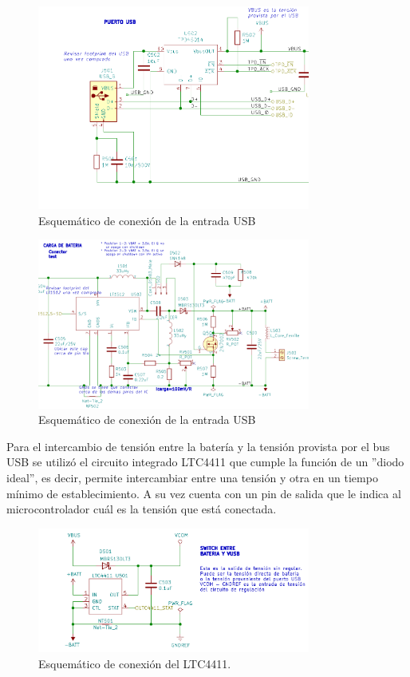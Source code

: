\begin{figure}[!htbp]
	\centering	
	\includegraphics[width=0.8\textwidth]{./Figures/usbesq.png}		
	\caption{Esquemático de conexión de la entrada USB}
	\label{fig:usbesq}
\end{figure}

\begin{figure}[!htbp]
	\centering
	\includegraphics[width=0.8\textwidth]{./Figures/cargaesq.png}		
	\caption{Esquemático de conexión de la entrada USB}
	\label{fig:cargaesq}
\end{figure}


Para el intercambio de tensión entre la batería y la tensión provista por el bus USB se utilizó el circuito integrado LTC4411 que cumple la función de un ''diodo ideal'', es decir, permite intercambiar entre una tensión y otra en un tiempo mínimo de establecimiento. A su vez cuenta con un pin de salida que le indica al microcontrolador cuál es la tensión que está conectada.


\begin{figure}[!htbp]
	\centering
	
	\includegraphics[width=0.8\textwidth]{./Figures/switchBateria.png}		
	
	\caption{Esquemático de conexión del LTC4411.}
	\label{fig:switchBateria}
\end{figure}

